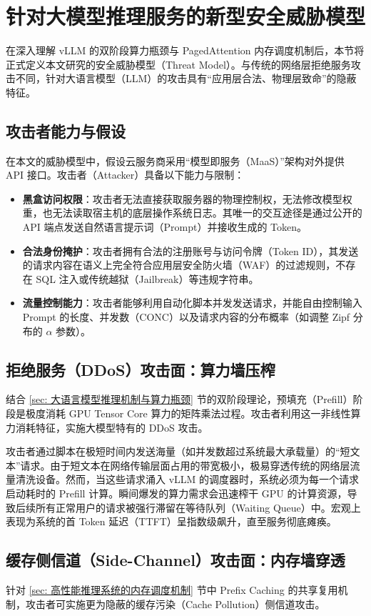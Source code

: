 \documentclass[master, vlined]{DissertUESTC}
\begin{document}
	\section{针对大模型推理服务的新型安全威胁模型}
	
	在深入理解 vLLM 的双阶段算力瓶颈与 PagedAttention 内存调度机制后，本节将正式定义本文研究的安全威胁模型（Threat Model）。与传统的网络层拒绝服务攻击不同，针对大语言模型（LLM）的攻击具有“应用层合法、物理层致命”的隐蔽特征。

	\subsection{攻击者能力与假设}
	在本文的威胁模型中，假设云服务商采用“模型即服务（MaaS）”架构对外提供 API 接口。攻击者（Attacker）具备以下能力与限制：
	\begin{itemize}
		\item \textbf{黑盒访问权限}：攻击者无法直接获取服务器的物理控制权，无法修改模型权重，也无法读取宿主机的底层操作系统日志。其唯一的交互途径是通过公开的 API 端点发送自然语言提示词（Prompt）并接收生成的 Token。
		\item \textbf{合法身份掩护}：攻击者拥有合法的注册账号与访问令牌（Token ID），其发送的请求内容在语义上完全符合应用层安全防火墙（WAF）的过滤规则，不存在 SQL 注入或传统越狱（Jailbreak）等违规字符串。
		\item \textbf{流量控制能力}：攻击者能够利用自动化脚本并发发送请求，并能自由控制输入 Prompt 的长度、并发数（CONC）以及请求内容的分布概率（如调整 Zipf 分布的 $\alpha$ 参数）。
	\end{itemize}

	\subsection{拒绝服务（DDoS）攻击面：算力墙压榨}
	结合 \ref{sec: 大语言模型推理机制与算力瓶颈} 节的双阶段理论，预填充（Prefill）阶段是极度消耗 GPU Tensor Core 算力的矩阵乘法过程。攻击者利用这一非线性算力消耗特征，实施大模型特有的 DDoS 攻击。

	攻击者通过脚本在极短时间内发送海量（如并发数超过系统最大承载量）的“短文本”请求。由于短文本在网络传输层面占用的带宽极小，极易穿透传统的网络层流量清洗设备。然而，当这些请求涌入 vLLM 的调度器时，系统必须为每一个请求启动耗时的 Prefill 计算。瞬间爆发的算力需求会迅速榨干 GPU 的计算资源，导致后续所有正常用户的请求被强行滞留在等待队列（Waiting Queue）中。宏观上表现为系统的首 Token 延迟（TTFT）呈指数级飙升，直至服务彻底瘫痪。

	\subsection{缓存侧信道（Side-Channel）攻击面：内存墙穿透}
	针对 \ref{sec: 高性能推理系统的内存调度机制} 节中 Prefix Caching 的共享复用机制，攻击者可实施更为隐蔽的缓存污染（Cache Pollution）侧信道攻击。
\end{document}
